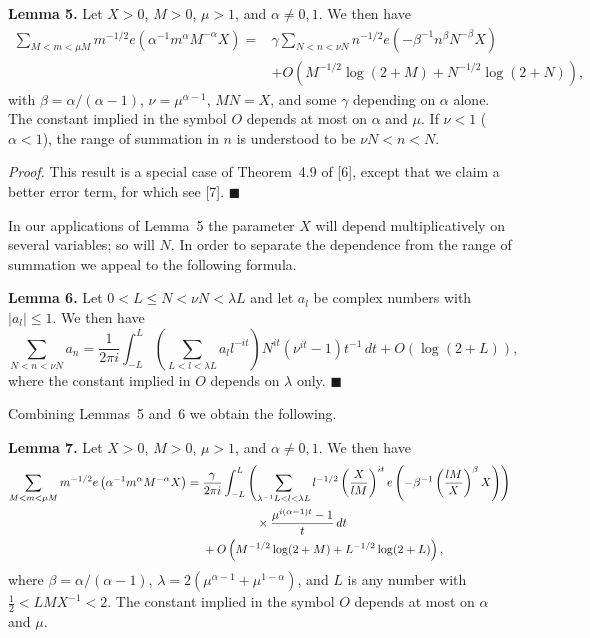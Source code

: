 \documentclass[10pt]{article}
\begin{document}
\medskip
\noindent\textbf{Lemma 5.}
Let $X>0$, $M>0$, $\mu>1$, and $\alpha\ne0,1$. We then have
\[
\begin{aligned}
\sum_{M<m<\mu M}m^{-1/2}
 e\left(\alpha^{-1}m^\alpha M^{-\alpha}X\right)
={}&\gamma\sum_{N<n<\nu N}n^{-1/2}
 e\left(-\beta^{-1}n^\beta N^{-\beta}X\right)\\
&+O\left(M^{-1/2}\log(2+M)+N^{-1/2}\log(2+N)\right),
\end{aligned}
\]
with $\beta=\alpha/(\alpha-1)$, $\nu=\mu^{\alpha-1}$, $MN=X$,
and some $\gamma$ depending on $\alpha$ alone. The constant implied in the
symbol $O$ depends at most on $\alpha$ and $\mu$. If $\nu<1$
($\alpha<1$), the range of summation in $n$ is understood to be
$\nu N<n<N$.

\medskip
\noindent\textit{Proof.}
This result is a special case of Theorem~4.9 of [6], except that we claim a
better error term, for which see [7]. \(\blacksquare\)

In our applications of Lemma~5 the parameter $X$ will depend
multiplicatively on several variables; so will $N$. In order to separate the
dependence from the range of summation we appeal to the following formula.

\medskip
\noindent\textbf{Lemma 6.}
Let $0<L\le N<\nu N<\lambda L$ and let $a_l$ be complex numbers with
$|a_l|\le1$. We then have
\[
\sum_{N<n<\nu N}a_n
 =\frac1{2\pi i}\int_{-L}^{L}
   \left(\sum_{L<l<\lambda L}a_l l^{-it}\right)
   N^{it}(\nu^{it}-1)t^{-1}\,dt+O(\log(2+L)),
\]
where the constant implied in $O$ depends on $\lambda$ only.
\(\blacksquare\)

Combining Lemmas~5 and~6 we obtain the following.

\medskip
\noindent\textbf{Lemma 7.}
Let $X>0$, $M>0$, $\mu>1$, and $\alpha\ne0,1$. We then have
\[
\begin{aligned}
\sum_{M<m<\mu M}m^{-1/2}
 e\left(\alpha^{-1}m^\alpha M^{-\alpha}X\right)
={}&\frac{\gamma}{2\pi i}\int_{-L}^{L}
 \left(\sum_{\lambda^{-1}L<l<\lambda L}
 l^{-1/2}\left(\frac{X}{lM}\right)^{it}
 e\left(-\beta^{-1}\left(\frac{lM}{X}\right)^\beta X\right)\right)\\
&\hspace{4.5em}\times
 \frac{\mu^{i(\alpha-1)t}-1}{t}\,dt\\
&+O\left(M^{-1/2}\log(2+M)+L^{-1/2}\log(2+L)\right),
\end{aligned}
\]
where $\beta=\alpha/(\alpha-1)$,
$\lambda=2(\mu^{\alpha-1}+\mu^{1-\alpha})$, and $L$ is any number with
$\frac12<LMX^{-1}<2$. The constant implied in the symbol $O$ depends at
most on $\alpha$ and $\mu$.
\end{document}
